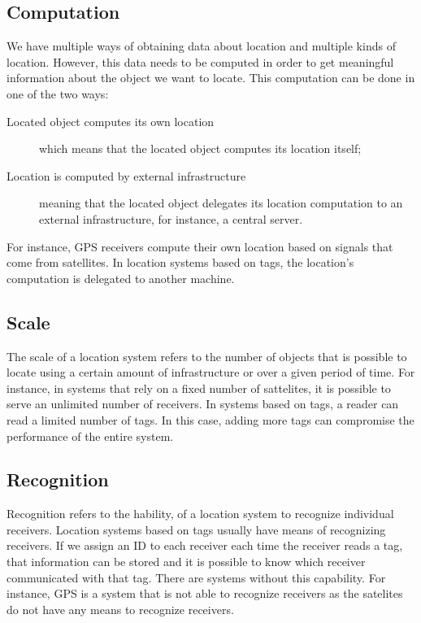 \subsection{Computation}
\label{sub:background_computation}
We have multiple ways of obtaining data about location and multiple kinds of location.
However, this data needs to be computed in order to get meaningful information about the object we want to locate.
This computation can be done in one of the two ways:
\begin{description}
  \item[Located object computes its own location] which means that the located object computes its location itself;
  \item[Location is computed by external infrastructure] meaning that the located object delegates its location computation to an external infrastructure, for instance, a central server.
\end{description}

For instance, \gls{GPS} receivers compute their own location based on signals that come from satellites.
In location systems based on tags, the location's computation is delegated to another machine.

\subsection{Scale}
\label{sub:background_scale}
The scale of a location system refers to the number of objects that is possible to locate using a certain amount of infrastructure or over a given period of time.
For instance, in systems that rely on a fixed number of sattelites, it is possible to serve an unlimited number of receivers.
In systems based on tags, a reader can read a limited number of tags.
In this case, adding more tags can compromise the performance of the entire system.

\subsection{Recognition}
\label{sub:background_recognition}
Recognition refers to the hability, of a location system to recognize individual receivers.
Location systems based on tags usually have means of recognizing receivers.
If we assign an \gls{ID} to each receiver each time the receiver reads a tag, that information can be stored and it is possible to know which receiver communicated with that tag.
There are systems without this capability.
For instance, \gls{GPS} is a system that is not able to recognize receivers as the satelites do not have any means to recognize receivers.

